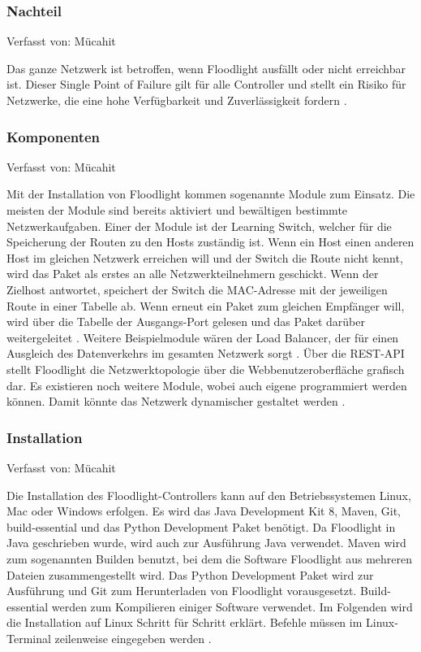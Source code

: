 \documentclass[fontsize=12pt,paper=a4,open=any,parskip=half,
  twoside=false,toc=listof,toc=bibliography,fleqn,leqno,
  captions=nooneline,captions=tableabove,british]{scrbook}
\begin{document}
\subsubsection{Nachteil}
{\tiny Verfasst von: Mücahit\par}
Das ganze Netzwerk ist betroffen, wenn Floodlight ausfällt oder nicht erreichbar ist. Dieser Single Point of Failure gilt für alle Controller und stellt ein Risiko für Netzwerke, die eine hohe Verfügbarkeit und Zuverlässigkeit fordern \cite{failure}.

\subsubsection{Komponenten}
{\tiny Verfasst von: Mücahit\par}
Mit der Installation von Floodlight kommen sogenannte Module zum Einsatz. Die meisten der Module sind bereits aktiviert und bewältigen bestimmte Netzwerkaufgaben. Einer der Module ist der Learning Switch, welcher für die Speicherung der Routen zu den Hosts zuständig ist. Wenn ein Host einen anderen Host im gleichen Netzwerk erreichen will und der Switch die Route nicht kennt, wird das Paket als erstes an alle Netzwerkteilnehmern geschickt. Wenn der Zielhost antwortet, speichert der Switch die MAC-Adresse mit der jeweiligen Route in einer Tabelle ab. Wenn erneut ein Paket zum gleichen Empfänger will, wird über die Tabelle der Ausgangs-Port gelesen und das Paket darüber weitergeleitet \cite{broadcast}. Weitere Beispielmodule wären der Load Balancer, der für einen Ausgleich des Datenverkehrs im gesamten Netzwerk sorgt \cite{loadbalance}. Über die REST-API stellt Floodlight die Netzwerktopologie über die Webbenutzeroberfläche grafisch dar. Es existieren noch weitere Module, wobei auch eigene programmiert werden können. Damit könnte das Netzwerk dynamischer gestaltet werden \cite{restapi}.

\subsubsection{Installation}
{\tiny Verfasst von: Mücahit\par}
Die Installation des Floodlight-Controllers kann auf den Betriebssystemen Linux, Mac oder Windows erfolgen. Es wird das Java Development Kit 8, Maven, Git, build-essential und das Python Development Paket benötigt. Da Floodlight in Java geschrieben wurde, wird auch zur Ausführung Java verwendet. Maven wird zum sogenannten Builden benutzt, bei dem die Software Floodlight aus mehreren Dateien zusammengestellt wird. Das Python Development Paket wird zur Ausführung und Git zum Herunterladen von Floodlight vorausgesetzt. Build-essential werden zum Kompilieren einiger Software verwendet. Im Folgenden wird die Installation auf Linux Schritt für Schritt erklärt. Befehle müssen im Linux-Terminal zeilenweise eingegeben werden \cite{install}.
\end{document}
